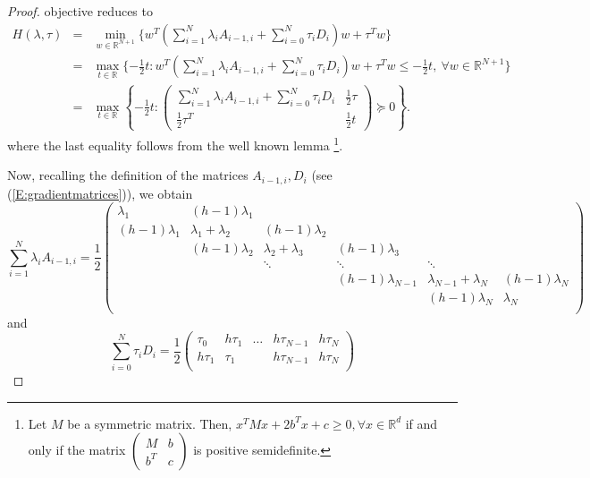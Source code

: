 \documentclass[12pt]{article}
\numberwithin{equation}{section}
\theoremstyle{definition}
\theoremstyle{remark}
\def\real{\mathbb{R}}
\begin{document}
\begin{proof}
objective reduces to
\begin{eqnarray*}
 H(\lambda, \tau) &=& \min_{w \in \real^{N+1}}\{w^T \left(\sum_{i=1}^N \lambda_i  A_{i-1,i}  +
        \sum_{i=0}^N \tau_i  D_i \right) w + \tau^T w \}\\
        &=&  \max_{t\in \mathbb{R}} \{-\frac{1}{2}t :
        w^T \left(\sum_{i=1}^N \lambda_i  A_{i-1,i}  +
        \sum_{i=0}^N \tau_i  D_i \right) w + \tau^T w \leq -\frac{1}{2}t,\ \forall w\in \mathbb{R}^{N+1}
        \}\\
 &=& \max_{t\in \mathbb{R}} \left\{
            -\frac{1}{2}t:
            \begin{pmatrix}
                \sum_{i=1}^N \lambda_i  A_{i-1,i}  + \sum_{i=0}^N \tau_i  D_i  & \frac{1}{2} \tau \\
                \frac{1}{2}\tau^T       & \frac{1}{2}t
        \end{pmatrix} \succeq 0
        \right\}.
\end{eqnarray*}
where the last equality follows from  the well known lemma
\cite[Page~163]{ben2001lectures}\footnote{Let $M$ be a symmetric matrix. Then, $x^TMx + 2 b^Tx+ c \geq 0, \forall x \in
\real^d$ if and only if the matrix $\begin{pmatrix} M & b\\ b^T & c \end{pmatrix}$ is positive
semidefinite.}.

Now, recalling the definition of the matrices $A_{i-1,i}, D_i$ (see
(\ref{E:gradientmatrices})), we obtain {\small
\[
    \sum_{i=1}^N \lambda_i  A_{i-1,i}  =
    \frac{1}{2}\begin{pmatrix}
        \lambda_1       & (h-1)\lambda_1            \\
        (h-1)\lambda_1          & \lambda_1+\lambda_2   & (h-1)\lambda_2                \\
            &       (h-1)\lambda_2          & \lambda_2 +\lambda_3  & (h-1)\lambda_3                \\
                                    &        & \ddots        &\ddots &   \ddots\\
                                            & &                 &       (h-1)\lambda_{N-1}  & \lambda_{N-1}+ \lambda_N & (h-1)\lambda_N \\
                                            & &                 &        &  (h-1)\lambda_N  & \lambda_N\\
    \end{pmatrix}
    \]
    }
and {\small
\[
    \sum_{i=0}^N \tau_i  D_i =
    \frac{1}{2} \begin{pmatrix}
        \tau_0          & h\tau_1           & \dots     &h\tau_{N-1}    &h\tau_N  \\
        h\tau_1             & \tau_1        &               &h\tau_{N-1}    &h\tau_N \\


\end{pmatrix}\]}
\end{proof}
\end{document}
